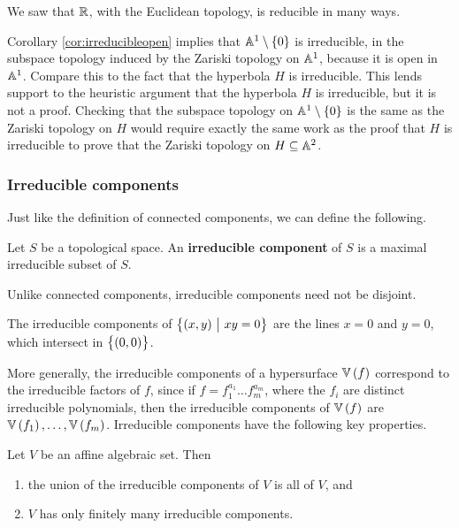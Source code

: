 \begin{example*}
We saw that $ \RR $, with the Euclidean topology, is reducible in many ways.
\end{example*}

Corollary \ref{cor:irreducibleopen} implies that $ \AA^1 \setminus \cbr{0} $ is irreducible, in the subspace topology induced by the Zariski topology on $ \AA^1 $, because it is open in $ \AA^1 $. Compare this to the fact that the hyperbola $ H $ is irreducible. This lends support to the heuristic argument that the hyperbola $ H $ is irreducible, but it is not a proof. Checking that the subspace topology on $ \AA^1 \setminus \cbr{0} $ is the same as the Zariski topology on $ H $ would require exactly the same work as the proof that $ H $ is irreducible to prove that the Zariski topology on $ H \subseteq \AA^2 $.

\subsubsection{Irreducible components}

Just like the definition of connected components, we can define the following.

\begin{definition*}
Let $ S $ be a topological space. An \textbf{irreducible component} of $ S $ is a maximal irreducible subset of $ S $.
\end{definition*}

Unlike connected components, irreducible components need not be disjoint.

\begin{example*}
The irreducible components of $ \cbr{\br{x, y} \st xy = 0} $ are the lines $ x = 0 $ and $ y = 0 $, which intersect in $ \cbr{\br{0, 0}} $.
\end{example*}

More generally, the irreducible components of a hypersurface $ \VV\br{f} $ correspond to the irreducible factors of $ f $, since if $ f = f_1^{a_1} \dots f_m^{a_m} $, where the $ f_i $ are distinct irreducible polynomials, then the irreducible components of $ \VV\br{f} $ are $ \VV\br{f_1}, \dots, \VV\br{f_m} $. Irreducible components have the following key properties.

\pagebreak

\begin{proposition}
\label{prop:irreduciblecomponent}
Let $ V $ be an affine algebraic set. Then
\begin{enumerate}
\item the union of the irreducible components of $ V $ is all of $ V $, and
\item $ V $ has only finitely many irreducible components.
\end{enumerate}
\end{proposition}

